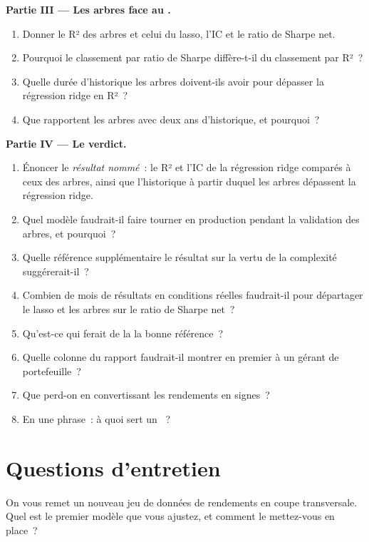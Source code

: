 \begin{problem}
\medskip\noindent\textbf{Partie III --- Les arbres face au .}
\begin{enumerate}[resume]
\item Donner le R² des arbres et celui du lasso, l'IC et le ratio de Sharpe net.
\item Pourquoi le classement par ratio de Sharpe diffère-t-il du classement par R²~?
\item Quelle durée d'historique les arbres doivent-ils avoir pour dépasser la régression ridge en R²~?
\item Que rapportent les arbres avec deux ans d'historique, et pourquoi~?
\end{enumerate}

\medskip\noindent\textbf{Partie IV --- Le verdict.}
\begin{enumerate}[resume]
\item Énoncer le \emph{résultat nommé}~: le R² et l'IC de la régression ridge comparés à ceux des arbres, ainsi que l'historique à partir duquel les arbres
dépassent la régression ridge.
\item Quel modèle faudrait-il faire tourner en production pendant la validation des arbres, et pourquoi~?
\item Quelle référence supplémentaire le résultat sur la vertu de la complexité suggérerait-il~?
\item Combien de mois de résultats en conditions réelles faudrait-il pour départager le lasso et les arbres sur le ratio de Sharpe net~?
\item Qu'est-ce qui ferait de la  la bonne référence~?
\item Quelle colonne du rapport faudrait-il montrer en premier à un gérant de portefeuille~?
\item Que perd-on en convertissant les rendements en signes~?
\item En une phrase~: à quoi sert un ~?
\end{enumerate}
\end{problem}

\section{Questions d'entretien}

\begin{interviewq}\label{iq:ml:linear-and-regularised-baselines:1}
On vous remet un nouveau jeu de données de rendements en coupe transversale. Quel est le premier modèle que vous ajustez, et comment le mettez-vous en place~?
\end{interviewq}

